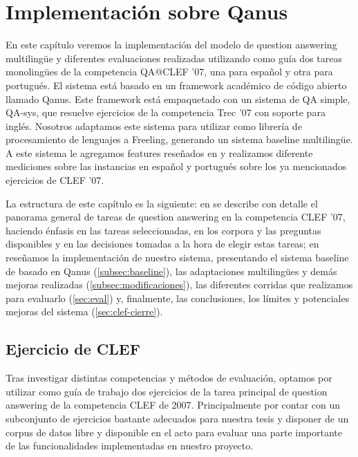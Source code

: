 \chapter{Implementación sobre Qanus}
\label{chap:qanus} \label{chap:5}

En este capítulo veremos la implementación del modelo de question answering multilingüe y diferentes evaluaciones realizadas utilizando como guía dos tareas monolingües de la competencia QA@CLEF '07, una para español y otra para portugués. El sistema está basado en un framework académico de código abierto llamado Qanus. Este framework está empaquetado con un sistema de QA simple, QA-sys, que resuelve ejercicios de la competencia Trec '07 con soporte para inglés. Nosotros adaptamos este sistema para utilizar como librería de procesamiento de lenguajes a Freeling, generando un sistema baseline multilingüe. A este sistema le agregamos features reseñados en  y realizamos diferente mediciones sobre las instancias en español y portugués sobre los ya mencionados ejercicios de CLEF '07.

La estructura de este capítulo es la siguiente: en  se describe con detalle el panorama general de tareas de question answering en la competencia CLEF '07, haciendo énfasis en las tareas seleccionadas, en los corpora y las preguntas disponibles y en las decisiones tomadas a la hora de elegir estas tareas; en  reseñamos la implementación de nuestro sistema, presentando el sistema baseline de basado en Qanus (\ref{subsec:baseline}), las adaptaciones multilingües y demás mejoras realizadas (\ref{subsec:modificaciones}), las diferentes corridas que realizamos para evaluarlo (\ref{sec:eval}) y, finalmente, las conclusiones, los límites y potenciales mejoras del sistema (\ref{sec:clef-cierre}).

\section{Ejercicio de CLEF}
\label{sec:ejercicio-de-clef}
Tras investigar distintas competencias y métodos de evaluación, optamos por utilizar como guía de trabajo dos ejercicios de la tarea principal de question answering de la competencia CLEF de 2007. Principalmente por contar con un subconjunto de ejercicios bastante adecuados para nuestra tesis y disponer de un corpus de datos libre y disponible en el acto para evaluar una parte importante de las funcionalidades implementadas en nuestro proyecto.

